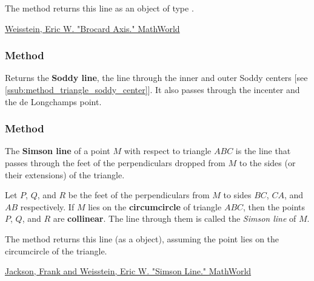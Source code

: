 The method  returns this line as an object of type .
\begin{flushright}
\small
\href{https://mathworld.wolfram.com/BrocardAxis.html}{Weisstein, Eric W. "Brocard Axis." MathWorld}
\end{flushright}

\vspace{1em}

\subsubsection{Method }
\label{ssub:method_triangle_soddy_line}

Returns the \textbf{Soddy line}, the line through the inner and outer Soddy
centers [see \ref{ssub:method_triangle_soddy_center}]. It also passes through
the incenter and the de Longchamps point.

\begin{tkzexample}
\end{tkzexample}

\subsubsection{Method } %
\label{ssub:method_triangle_simson__line}

The \textbf{Simson line} of a point $M$ with respect to triangle $ABC$ is the line that passes through the feet of the perpendiculars dropped from $M$ to the sides (or their extensions) of the triangle.

\medskip

Let $P$, $Q$, and $R$ be the feet of the perpendiculars from $M$ to sides $BC$, $CA$, and $AB$ respectively. If $M$ lies on the \textbf{circumcircle} of triangle $ABC$, then the points $P$, $Q$, and $R$ are \textbf{collinear}. The line through them is called the \emph{Simson line} of $M$.

\medskip

The method  returns this line (as a  object), assuming the point  lies on the circumcircle of the triangle.
\begin{flushright}
\small
\href{https://mathworld.wolfram.com/SimsonLine.html}{Jackson, Frank and Weisstein, Eric W. "Simson Line." MathWorld}
\end{flushright}

